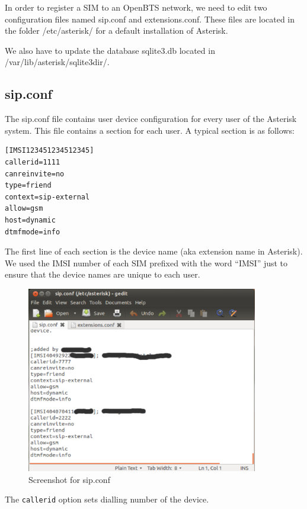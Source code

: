 In order to register a SIM to an OpenBTS network, we need to edit two 
configuration files named \textsf{sip.conf} and \textsf{extensions.conf}. These
files are located in the folder \textsf{/etc/asterisk/} for a default 
installation of Asterisk.

We also have to update the database \textsf{sqlite3.db} located in
\textsf{/var/lib/asterisk/sqlite3dir/}.

\subsection{sip.conf}

The \textsf{sip.conf} file contains user device configuration for every user of 
the Asterisk system. This file contains a section for each user. A typical 
section is as follows:
\begin{verbatim}
[IMSI123451234512345]
callerid=1111
canreinvite=no
type=friend
context=sip-external
allow=gsm
host=dynamic
dtmfmode=info    
\end{verbatim}

The first line of each section is the device name (aka extension name in
Asterisk). We used the IMSI number of each SIM prefixed with the word ``IMSI''
just to ensure that the device names are unique to each user.

\begin{figure}
  \centering
    \includegraphics[width=0.9\textwidth]{../images/sip_conf}
  \caption[Screenshot - sip.conf]{Screenshot for \textsf{sip.conf}}
  \label{sip_conf}
\end{figure}

The \texttt{callerid} option sets dialling number of the device.

